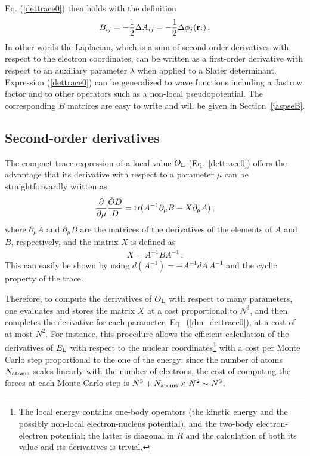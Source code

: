 \documentclass[aip,jcp,reprint,floatfix,onecolumn]{revtex4-1}
\def\wdet{D}
\begin{document}
Eq. (\ref{dettrace0}) then holds with the definition
\begin{equation}
B_{ij} = -\frac{1}{2}\Delta A_{ij} =- \frac{1}{2} \Delta \phi_j ({\bf r}_i)\,.
\label{B_kin_det}
\end{equation}
In other words the Laplacian, which is a sum of second-order derivatives with respect to the electron coordinates, can be written as a  first-order derivative  with respect to an auxiliary parameter $\lambda$  when applied to a Slater determinant.
Expression
(\ref{dettrace0}) can be generalized to wave functions including a Jastrow factor and to other operators such as a non-local pseudopotential.
The corresponding $B$ matrices are easy   to write and will be given in
Section~\ref{jaspseB}.

\subsection{Second-order derivatives}
\label{2deriv_1det}

The compact trace expression of a local value $O_{\rm L}$ (Eq.~\ref{dettrace0}) offers the advantage that its derivative with respect to a parameter $\mu$ can be straightforwardly written as
\begin{eqnarray}
\frac{\partial}{\partial \mu}\frac{\hat{O}\wdet}{\wdet}
={\rm tr}(A^{-1}\partial_\mu B-X\partial_\mu A)\,,
\label{dm_dettrace0}
\end{eqnarray}
where $\partial_\mu A$ and $\partial_\mu B$ are the matrices of the derivatives of the elements of $A$ and $B$, respectively, and the matrix
$X$ is defined as
\begin{eqnarray}
X=A^{-1}{B}A^{-1}\,.
\label{X_mat}
\end{eqnarray}
This can easily be shown by using $d(A^{-1})=-A^{-1}dA\,A^{-1}$ and the cyclic property of the trace.

Therefore, to compute the derivatives of $O_{\rm L}$ with respect to many parameters,
one evaluates and stores the matrix $X$ at a cost
proportional to $N^3$, and then completes the derivative for each parameter,
Eq.~(\ref{dm_dettrace0}), at a cost of at most $N^2$. For instance, this procedure allows the efficient
calculation of the derivatives of $E_{\rm L}$ with respect to the nuclear coordinates\footnote{The local energy contains one-body operators (the kinetic energy
and the possibly non-local electron-nucleus potential), and
the two-body electron-electron potential; the latter is
diagonal in $R$ and the calculation of both its value and
its derivatives is trivial.} with a cost per Monte Carlo step proportional to the one of the energy:  since the number of
atoms $N_{\rm atoms}$ scales linearly with the number of electrons, the cost of computing the forces at each Monte Carlo step is
$N^3+N_{\rm atoms}\times N^2\sim N^3$.
\end{document}
